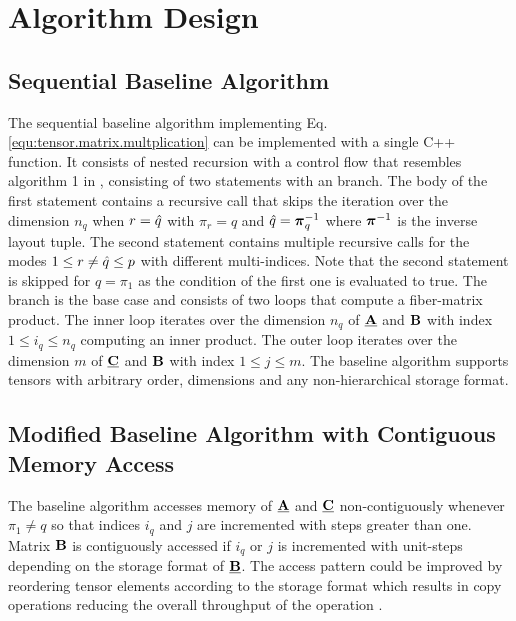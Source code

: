 \section{Algorithm Design}
\label{sec:design}
\subsection{Sequential Baseline Algorithm}
\label{sec:design:sequential.baseline.algorithm}
The sequential baseline algorithm implementing Eq. \ref{equ:tensor.matrix.multplication} can be implemented with a single C++ function.
It consists of nested recursion with a control flow that resembles algorithm 1 in \cite{bassoy:2018:fast}, consisting of two  statements with an  branch.
The body of the first  statement contains a recursive call that skips the iteration over the dimension $n_{q}$ when $r = \hat{q}$ with $\pi_r = q$ and $\hat{q} = \boldsymbol{\pi}^{-1}_q$ where $\boldsymbol{\pi}^{-1}$ is the inverse layout tuple.
The second  statement contains multiple recursive calls for the modes $1 \leq r \neq \hat{q} \leq p$ with different multi-indices.
Note that the second  statement is skipped for $q = \pi_1$ as the condition of the first one is evaluated to true.
The  branch is the base case and consists of two loops that compute a fiber-matrix product.
The inner loop iterates over the dimension $n_q$ of $\underline{\mathbf{A}}$ and $\mathbf{B}$ with index $1\leq i_q \leq n_q$ computing an inner product.
The outer loop iterates over the dimension $m$ of $\underline{\mathbf{C}}$ and $\mathbf{B}$ with index $1 \leq j \leq m$.
The baseline algorithm supports tensors with arbitrary order, dimensions and any non-hierarchical storage format.

\subsection{Modified Baseline Algorithm with Contiguous Memory Access}
\label{sec:design:modified.baseline.algorithm}
The baseline algorithm accesses memory of $\underline{\mathbf{A}}$ and $\underline{\mathbf{C}}$ non-contiguously whenever $\pi_1 \neq q$ so that indices $i_q$ and $j$ are incremented with steps greater than one.
Matrix $\mathbf{B}$ is contiguously accessed if $i_q$ or $j$ is incremented with unit-steps depending on the storage format of $\underline{\mathbf{B}}$.
The access pattern could be improved by reordering tensor elements according to the storage format which results in copy operations reducing the overall throughput of the operation \cite{shi:2016:tensor.contraction}.

